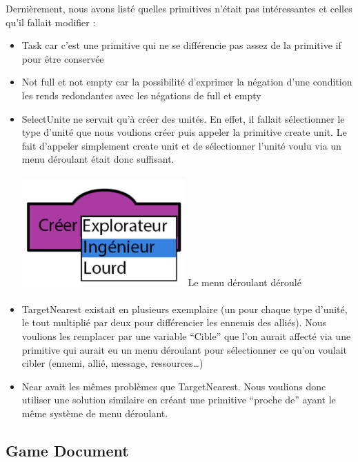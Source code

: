 \documentclass{report}
\begin{document}
  Dernièrement, nous avons listé quelles primitives n’était pas intéressantes et celles qu’il fallait modifier :
\begin{itemize}
\item Task car c’est une primitive qui ne se différencie pas assez de la primitive if pour être conservée
\item Not full et not empty car la possibilité d’exprimer la négation d’une condition les rends redondantes avec les négations de full et empty
\item SelectUnite ne servait qu’à créer des unités. En effet, il fallait sélectionner le type d’unité que nous voulions créer puis appeler la primitive create unit. Le fait d’appeler simplement create unit et de sélectionner l’unité voulu via un menu déroulant était donc suffisant.
\paragraph{}
\begin{center}
\includegraphics[scale=1]{DATA/deroulant.png}
 {Le menu déroulant déroulé}
\end{center}
\paragraph{}
\item TargetNearest existait en plusieurs exemplaire (un pour chaque type d’unité, le tout multiplié par deux pour différencier les ennemis des alliés). Nous voulions les remplacer par une variable “Cible” que l’on aurait affecté via une primitive qui aurait eu un menu déroulant pour sélectionner ce qu’on voulait cibler (ennemi, allié, message, ressources…)
\item Near avait les mêmes problèmes que TargetNearest. Nous voulions donc utiliser une solution similaire en créant une primitive “proche de” ayant le même système de menu déroulant.
\end{itemize}
\newpage
\subsection{Game Document}
\end{document}
